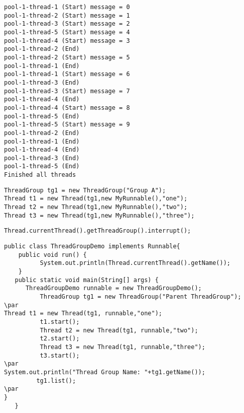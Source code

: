 \documentclass{book}
\def\lthtmlcheckvsize{\ifdim\ht\sizebox<\vsize 
  \ifdim\wd\sizebox<\hsize\expandafter\hfill\fi \expandafter\vfill
  \else\expandafter\vss\fi}%
\begin{document}
{\newpage\clearpage
{}%
\begin{lstlisting}
pool-1-thread-1 (Start) message = 0
pool-1-thread-2 (Start) message = 1
pool-1-thread-3 (Start) message = 2
pool-1-thread-5 (Start) message = 4
pool-1-thread-4 (Start) message = 3
pool-1-thread-2 (End)
pool-1-thread-2 (Start) message = 5
pool-1-thread-1 (End)
pool-1-thread-1 (Start) message = 6
pool-1-thread-3 (End)
pool-1-thread-3 (Start) message = 7
pool-1-thread-4 (End)
pool-1-thread-4 (Start) message = 8
pool-1-thread-5 (End)
pool-1-thread-5 (Start) message = 9
pool-1-thread-2 (End)
pool-1-thread-1 (End)
pool-1-thread-4 (End)
pool-1-thread-3 (End)
pool-1-thread-5 (End)
Finished all threads
\end{lstlisting}%
\lthtmlfigureZ
\lthtmlcheckvsize\clearpage}

{\newpage\clearpage
{}%
\begin{lstlisting}
ThreadGroup tg1 = new ThreadGroup("Group A");   
Thread t1 = new Thread(tg1,new MyRunnable(),"one");     
Thread t2 = new Thread(tg1,new MyRunnable(),"two");     
Thread t3 = new Thread(tg1,new MyRunnable(),"three");    
\end{lstlisting}%
\lthtmlfigureZ
\lthtmlcheckvsize\clearpage}

{\newpage\clearpage
{}%
\begin{lstlisting}
Thread.currentThread().getThreadGroup().interrupt();  
\end{lstlisting}%
\lthtmlfigureZ
\lthtmlcheckvsize\clearpage}

{\newpage\clearpage
{}%
\begin{lstlisting}
public class ThreadGroupDemo implements Runnable{  
    public void run() {  
          System.out.println(Thread.currentThread().getName());  
    }  
   public static void main(String[] args) {  
      ThreadGroupDemo runnable = new ThreadGroupDemo();  
          ThreadGroup tg1 = new ThreadGroup("Parent ThreadGroup");  
\par
Thread t1 = new Thread(tg1, runnable,"one");  
          t1.start();  
          Thread t2 = new Thread(tg1, runnable,"two");  
          t2.start();  
          Thread t3 = new Thread(tg1, runnable,"three");  
          t3.start();  
\par
System.out.println("Thread Group Name: "+tg1.getName());  
         tg1.list();  
\par
}  
   }  
	\end{lstlisting}%
\lthtmlfigureZ
\lthtmlcheckvsize\clearpage}
\end{document}
